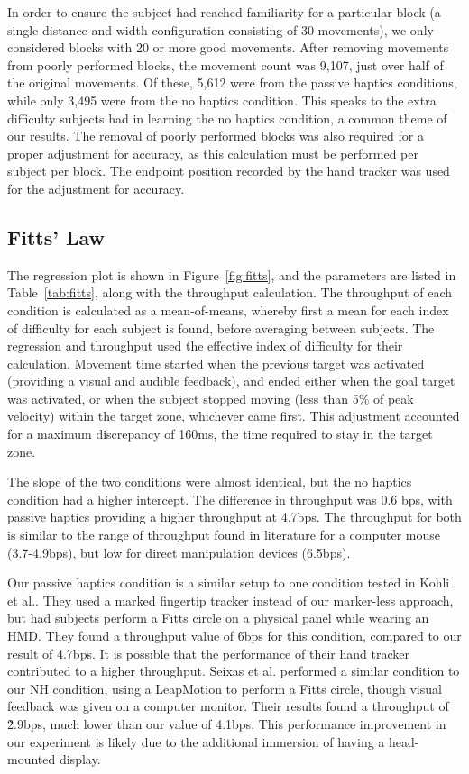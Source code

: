 \documentclass[]{aiaa-tc}%
\begin{document}
In order to ensure the subject had reached familiarity for a particular block (a single distance and width configuration consisting of 30 movements), we only considered blocks with 20 or more good movements.
After removing movements from poorly performed blocks, the movement count was 9,107, just over half of the original movements.
Of these, 5,612 were from the passive haptics conditions, while only 3,495 were from the no haptics condition.
This speaks to the extra difficulty subjects had in learning the no haptics condition, a common theme of our results.
The removal of poorly performed blocks was also required for a proper adjustment for accuracy, as this calculation must be performed per subject per block.
The endpoint position recorded by the hand tracker was used for the adjustment for accuracy.

\subsection{Fitts' Law}

The regression plot is shown in Figure~\ref{fig:fitts}, and the parameters are listed in Table~\ref{tab:fitts}, along with the throughput calculation.
The throughput of each condition is calculated as a mean-of-means, whereby first a mean for each index of difficulty for each subject is found, before averaging between subjects.
The regression and throughput used the effective index of difficulty for their calculation.
Movement time started when the previous target was activated (providing a visual and audible feedback), and ended either when the goal target was activated, or when the subject stopped moving (less than 5\% of peak velocity) within the target zone, whichever came first.
This adjustment accounted for a maximum discrepancy of 160ms, the time required to stay in the target zone.

The slope of the two conditions were almost identical, but the no haptics condition had a higher intercept.
The difference in throughput was 0.6 bps, with passive haptics providing a higher throughput at 4.7bps.
The throughput for both is similar to the range of throughput found in literature for a computer mouse (3.7-4.9bps)\cite{soukoreff_towards_2004}, but low for direct manipulation devices (6.5bps)\cite{mackenzie_fitts_2015}.

Our passive haptics condition is a similar setup to one condition tested in Kohli et al.\cite{kohli_redirected_2012}.
They used a marked fingertip tracker instead of our marker-less approach, but had subjects perform a Fitts circle on a physical panel while wearing an HMD.
They found a throughput value of \~6bps for this condition, compared to our result of 4.7bps.
It is possible that the performance of their hand tracker contributed to a higher throughput.
Seixas et al.\cite{seixas_one_2015} performed a similar condition to our NH condition, using a LeapMotion to perform a Fitts circle, though visual feedback was given on a computer monitor.
Their results found a throughput of \~2.9bps, much lower than our value of 4.1bps.
This performance improvement in our experiment is likely due to the additional immersion of having a head-mounted display.
\end{document}
